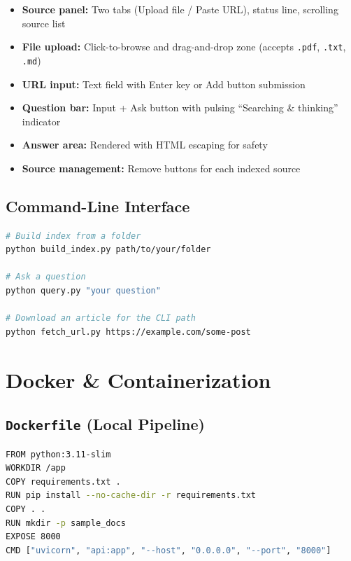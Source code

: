 \documentclass[11pt,a4paper]{paper}
\begin{document}
\begin{itemize}
  \item \textbf{Source panel:} Two tabs (Upload file / Paste URL), status line, scrolling source list
  \item \textbf{File upload:} Click-to-browse and drag-and-drop zone (accepts \texttt{.pdf}, \texttt{.txt}, \texttt{.md})
  \item \textbf{URL input:} Text field with Enter key or Add button submission
  \item \textbf{Question bar:} Input + Ask button with pulsing ``Searching \& thinking'' indicator
  \item \textbf{Answer area:} Rendered with HTML escaping for safety
  \item \textbf{Source management:} Remove buttons for each indexed source
\end{itemize}

\subsection{Command-Line Interface}

\begin{lstlisting}[language=bash, style=bashstyle, caption={CLI commands.}, label=lst:cli]
# Build index from a folder
python build_index.py path/to/your/folder

# Ask a question
python query.py "your question"

# Download an article for the CLI path
python fetch_url.py https://example.com/some-post
\end{lstlisting}

\section{Docker \& Containerization}
\label{sec:docker}

\subsection{\texttt{Dockerfile} (Local Pipeline)}

\begin{lstlisting}[language=bash, style=bashstyle, caption={Dockerfile (local pipeline).}, label=lst:dockerfile]
FROM python:3.11-slim
WORKDIR /app
COPY requirements.txt .
RUN pip install --no-cache-dir -r requirements.txt
COPY . .
RUN mkdir -p sample_docs
EXPOSE 8000
CMD ["uvicorn", "api:app", "--host", "0.0.0.0", "--port", "8000"]
\end{lstlisting}
\end{document}
